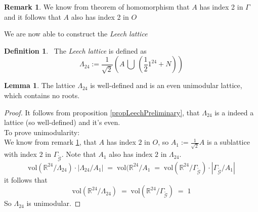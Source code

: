 \documentclass[12pt]{article}
\theoremstyle{definition}
\newtheorem{lemma}[theorem]{Lemma}
\newtheorem{definition}[theorem]{Definition}
\newtheorem{remark}[theorem]{Remark}
\numberwithin{equation}{theorem}
\numberwithin{figure}{theorem}
\newcommand{\cCodes}{\ensuremath{\widetilde{\mathcal{G}}}}
\newcommand{\buildLattice}[1]{\ensuremath{\Gamma_{#1}}}
\newcommand{\wt}[1]{\ensuremath{\text{wt}(#1)}}
\newcommand{\Real}{\ensuremath{\mathbb{R}}}
\begin{document}
\begin{remark}\label{remarkLeechPreli}
We know from theorem of homomorphism that $A$ has index 2 in $\Gamma$ and it follows that $A$ also has index 2 in $O$
\end{remark}
We are now able to construct the \emph{Leech lattice}
\begin{definition}\label{defLeech}\
The \emph{Leech lattice} is defined as
	\[
		\Lambda_{24} := \frac{1}{\sqrt{2}} \left( A \, \bigcup \,(\frac{1}{2}1^{24} + N) \right)
	\]
\end{definition}
\begin{lemma}\label{lemmaLeech}
The lattice $\Lambda_{24}$ is well-defined and is an even unimodular lattice, which contains no roots.
\end{lemma}
\begin{proof}
It follows from proposition \ref{propLeechPreliminary}, that $\Lambda_{24}$ is a indeed a lattice (so well-defined) and it's even.\\
To prove unimodularity:\\
We know from remark \ref{remarkLeechPreli}, that $A$ has index $2$ in $O$, so $A_1 := \frac{1}{\sqrt{2}}A$ is a sublattice with index $2$ in $\buildLattice{\cCodes}$. Note that $A_1$ also has index $2$ in $\Lambda_{24}$.
\[
	\text{vol}(\Real^{24}/{\Lambda_{24}}) \cdot |\Lambda_{24}/A_1| \;=\; \text{vol}(\Real^{24}/A_1 \;=\; \text{vol}(\Real^{24}/\buildLattice{\cCodes}) \cdot |\buildLattice{\cCodes}/A_1|
\]
it follows that 
\[
	\text{vol}(\Real^{24}/{\Lambda_{24}}) \; = \; \text{vol}(\Real^{24}/\buildLattice{\cCodes}) \; = \; 1
\]
So $\Lambda_{24}$ is unimodular.
\end{proof}
\end{document}
